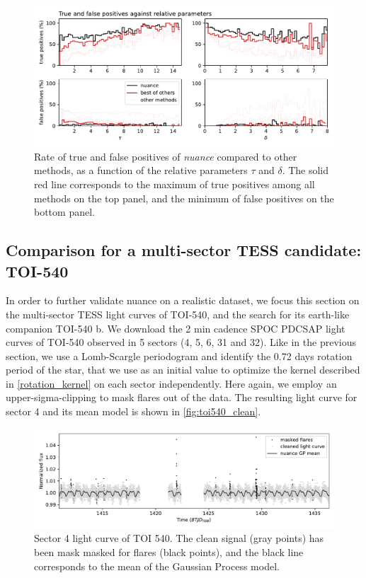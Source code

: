 \documentclass{aastex631}
\newcommand{\nuancemethod}{\textit{nuance}}
\newcommand{\nuance}{\nuancemethod{}}
\begin{document}
\begin{figure}[H]
    \begin{centering}
        \includegraphics[width=0.9\linewidth]{../workflows/tess_injection_recovery/figures/true_false_positives.pdf}
        \caption{Rate of true and false positives of \nuance{} compared to other methods, as a function of the relative parameters $\tau$ and $\delta$. The solid red line corresponds to the maximum of true positives among all methods on the top panel, and the minimum of false positives on the bottom panel.}
        \label{fig:allsearch_relative}
    \end{centering}
\end{figure}

\newpage
\subsection{Comparison for a multi-sector TESS candidate: TOI-540}\label{toi540}

In order to further validate nuance on a realistic dataset, we focus this section on the multi-sector TESS light curves of TOI-540, and the search for its earth-like companion TOI-540 b. We download the 2 min cadence SPOC PDCSAP light curves of TOI-540 observed in 5 sectors (4, 5, 6, 31 and 32). Like in the previous section, we use a Lomb-Scargle periodogram and identify the 0.72 days rotation period of the star, that we use as an initial value to optimize the kernel described in \autoref{rotation_kernel} on each sector independently. Here again, we employ an upper-sigma-clipping to mask flares out of the data. The resulting light curve for sector 4 and its mean model is shown in \autoref{fig:toi540_clean}.

\begin{figure}[H]
    \begin{centering}
        \includegraphics[width=0.9\linewidth]{../workflows/comparison_toi/figures/TOI 540/4.pdf}
        \caption{Sector 4 light curve of TOI 540. The clean signal (gray points) has been mask masked for flares (black points), and the black line corresponds to the mean of the Gaussian Process model.}
        \label{fig:toi540_clean}
    \end{centering}
\end{figure}
\end{document}

